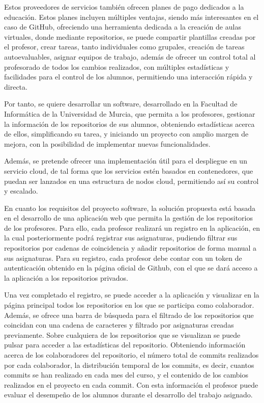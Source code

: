 Estos proveedores de servicios también ofrecen planes de pago
dedicados a la educación. Estos planes incluyen múltiples ventajas,
siendo más interesantes en el caso de GitHub, ofreciendo una
herramienta dedicada a la creación de aulas virtuales, donde mediante
repositorios, se puede compartir plantillas creadas por el profesor,
crear tareas, tanto individuales como grupales, creación de tareas
autoevaluables, asignar equipos de trabajo, además de ofrecer un
control total al profesorado de todos los cambios realizados, con
múltiples estadísticas y facilidades para el control de los alumnos,
permitiendo una interacción rápida y directa.

Por tanto, se quiere desarrollar un software, desarrollado en la
Facultad de Informática de la Universidad de Murcia, que permita a los
profesores, gestionar la información de los repositorios de sus
alumnos, obteniendo estadísticas acerca de ellos, simplificando su
tarea, y iniciando un proyecto con amplio margen de mejora, con la
posibilidad de implementar nuevas funcionalidades.

Además, se pretende ofrecer una implementación útil para el despliegue
en un servicio cloud, de tal forma que los servicios estén basados en
contenedores, que puedan ser lanzados en una estructura de nodos
cloud, permitiendo así su control y escalado.

En cuanto los requisitos del proyecto software, la solución propuesta
está basada en el desarrollo de una aplicación web que permita la
gestión de los repositorios de los profesores. Para ello, cada
profesor realizará un registro en la aplicación, en la cual
posteriormente podrá registrar sus asignaturas, pudiendo filtrar sus
repositorios por cadenas de coincidencia y añadir repositorios de
forma manual a sus asignaturas. Para su registro, cada profesor debe
contar con un token de autenticación obtenido en la página oficial de
Github, con el que se dará acceso a la aplicación a los repositorios
privados.

Una vez completado el registro, se puede acceder a la aplicación y
visualizar en la página principal todos los repositorios en los que se
participa como colaborador. Además, se ofrece una barra de búsqueda
para el filtrado de los repositorios que coincidan con una cadena de
caracteres y filtrado por asignaturas creadas previamente. Sobre
cualquiera de los repositorios que se visualizan se puede pulsar
para acceder a las estadísticas del repositorio. Obteniendo
información acerca de los colaboradores del repositorio, el número
total de commits realizados por cada colaborador, la distribución
temporal de los commits, es decir, cuantos commits se han realizado en
cada mes del curso, y el contenido de los cambios realizados en el
proyecto en cada commit. Con esta información el profesor puede
evaluar el desempeño de los alumnos durante el desarrollo del trabajo
asignado.


